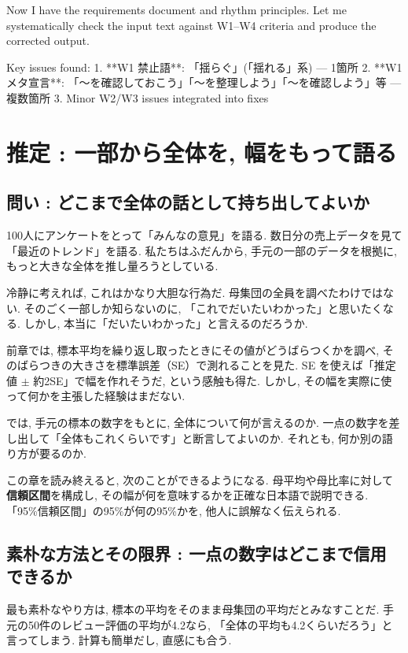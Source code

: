 ﻿Now I have the requirements document and rhythm principles. Let me systematically check the input text against W1–W4 criteria and produce the corrected output.

Key issues found:
1. **W1 禁止語**: 「揺らぐ」(「揺れる」系) — 1箇所
2. **W1 メタ宣言**: 「〜を確認しておこう」「〜を整理しよう」「〜を確認しよう」等 — 複数箇所
3. Minor W2/W3 issues integrated into fixes

\section{推定 : 一部から全体を, 幅をもって語る}
\label{sec:inference}

\subsection{問い : どこまで全体の話として持ち出してよいか}

100人にアンケートをとって「みんなの意見」を語る.
数日分の売上データを見て「最近のトレンド」を語る.
私たちはふだんから, 手元の一部のデータを根拠に, もっと大きな全体を推し量ろうとしている.

冷静に考えれば, これはかなり大胆な行為だ.
母集団の全員を調べたわけではない.
そのごく一部しか知らないのに, 「これでだいたいわかった」と思いたくなる.
しかし, 本当に「だいたいわかった」と言えるのだろうか.

前章では, 標本平均を繰り返し取ったときにその値がどうばらつくかを調べ, そのばらつきの大きさを標準誤差（SE）で測れることを見た.
SE を使えば「推定値 $\pm$ 約2SE」で幅を作れそうだ, という感触も得た.
しかし, その幅を実際に使って何かを主張した経験はまだない.

では, 手元の標本の数字をもとに, 全体について何が言えるのか.
一点の数字を差し出して「全体もこれくらいです」と断言してよいのか.
それとも, 何か別の語り方が要るのか.

この章を読み終えると, 次のことができるようになる.
母平均や母比率に対して\textbf{信頼区間}を構成し, その幅が何を意味するかを正確な日本語で説明できる.
「95\%信頼区間」の95\%が何の95\%かを, 他人に誤解なく伝えられる.


\subsection{素朴な方法とその限界 : 一点の数字はどこまで信用できるか}

最も素朴なやり方は, 標本の平均をそのまま母集団の平均だとみなすことだ.
手元の50件のレビュー評価の平均が4.2なら, 「全体の平均も4.2くらいだろう」と言ってしまう.
計算も簡単だし, 直感にも合う.


